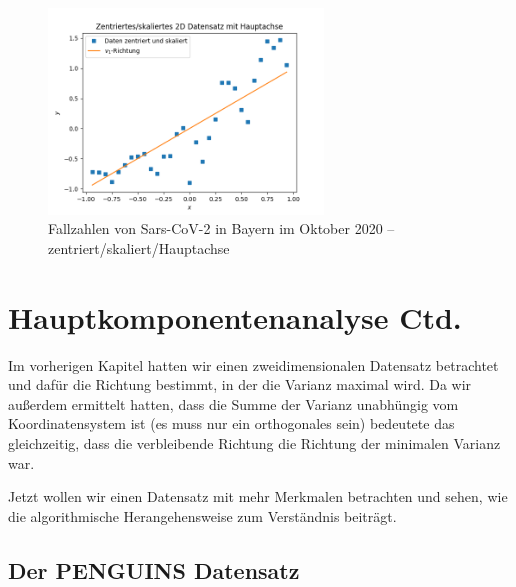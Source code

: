 \documentclass[]{book}
\theoremstyle{definition}
\theoremstyle{definition}
\theoremstyle{definition}
\theoremstyle{definition}
\theoremstyle{remark}
\begin{document}
\begin{figure}
\hypertarget{fig:cases-cntrd-HA}{%
\centering
\includegraphics[width=0.65\textwidth,height=\textheight]{bilder/04-covid-cntrd-HA.png}
\caption{Fallzahlen von Sars-CoV-2 in Bayern im Oktober
2020 -- zentriert/skaliert/Hauptachse}\label{fig:cases-cntrd-HA}
}
\end{figure}

\hypertarget{hauptkomponentenanalyse-ctd.}{%
\chapter{Hauptkomponentenanalyse Ctd.}\label{hauptkomponentenanalyse-ctd.}}

\newcommand{\Cov}{\operatorname{Cov}}
\newcommand{\bX}{{\mathbf{X}}}
\newcommand{\bxi}{{\mathbf{x} _ i}}
\newcommand{\bxj}{{\mathbf{x} _ j}}
\newcommand{\bxixj}{{\mathbf{x} _ i \mathbf{x} _ j}}

Im vorherigen Kapitel hatten wir einen zweidimensionalen Datensatz betrachtet und dafür die Richtung bestimmt, in der die Varianz maximal wird.
Da wir außerdem ermittelt hatten, dass die Summe der Varianz unabhüngig vom Koordinatensystem ist (es muss nur ein orthogonales sein) bedeutete das gleichzeitig, dass die verbleibende Richtung die Richtung der minimalen Varianz war.

Jetzt wollen wir einen Datensatz mit mehr Merkmalen betrachten und sehen, wie die algorithmische Herangehensweise zum Verständnis beiträgt.

\hypertarget{der-penguins-datensatz}{%
\section{Der PENGUINS Datensatz}\label{der-penguins-datensatz}}
\end{document}
